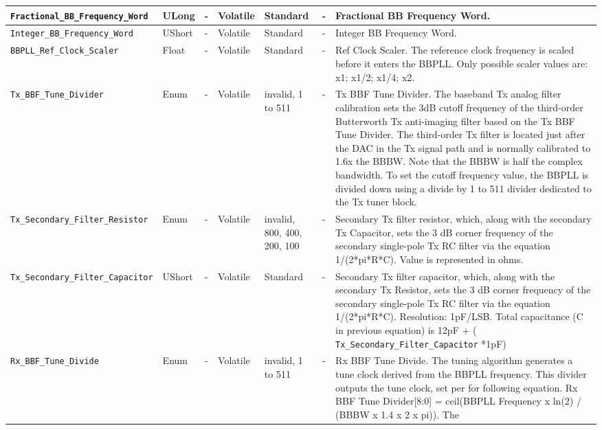 \documentclass{article}
\begin{document}
\begin{landscape}
\begin{scriptsize}
\begin{longtable}{|p{3.6cm}|p{8.1cm}|p{1.4cm}|p{1.3cm}|p{1.4cm}|p{2.5cm}|p{3.6cm}|}
			\hline
			\verb+Fractional_BB_Frequency_Word+ & ULong & - & Volatile & Standard & - & Fractional BB Frequency Word. \\
			\hline
			\verb+Integer_BB_Frequency_Word+ & UShort & - & Volatile & Standard & - & Integer BB Frequency Word. \\
			\hline
			\verb+BBPLL_Ref_Clock_Scaler+ & Float & - & Volatile & Standard & - & Ref Clock Scaler. The reference clock frequency is scaled before it enters the BBPLL. Only possible scaler values are: x1; x1/2; x1/4; x2. \\
			\hline
			\verb+Tx_BBF_Tune_Divider+ & Enum & - & Volatile & invalid, 1 to 511 & - & Tx BBF Tune Divider. The baseband Tx analog filter calibration sets the 3dB cutoff frequency of the third-order Butterworth Tx anti-imaging filter based on the Tx BBF Tune Divider. The third-order Tx filter is located just after the DAC in the Tx signal path and is normally calibrated to 1.6x the BBBW. Note that the BBBW is half the complex bandwidth. To set the cutoff frequency value, the BBPLL is divided down using a divide by 1 to 511 divider dedicated to the Tx tuner block. \\
			\hline
			\verb+Tx_Secondary_Filter_Resistor+ & Enum & - & Volatile & invalid, 800, 400, 200, 100 & - & Secondary Tx filter resistor, which, along with the secondary Tx Capacitor, sets the 3 dB corner frequency of the secondary single-pole Tx RC filter via the equation 1/(2*pi*R*C). Value is represented in ohms. \\
			\hline
			\verb+Tx_Secondary_Filter_Capacitor+ & UShort & - & Volatile & Standard & - &
Secondary Tx filter capacitor, which, along with the secondary Tx Resistor, sets the 3 dB corner frequency of the secondary single-pole Tx RC filter via the equation 1/(2*pi*R*C). Resolution: 1pF/LSB. Total capacitance (C in previous equation) is 12pF + ( \verb+Tx_Secondary_Filter_Capacitor+ *1pF) \\
			\hline
			\verb+Rx_BBF_Tune_Divide+ & Enum & - & Volatile & invalid, 1 to 511 & - &
                                      Rx BBF Tune Divide. The
                                        tuning algorithm generates a tune clock
                                        derived from the BBPLL frequency. This
                                        divider outputs the tune clock, set per
                                        for following equation. Rx BBF Tune
                                        Divider[8:0] = ceil(BBPLL Frequency x
                                        ln(2) / (BBBW x 1.4 x 2 x pi)). The

\end{longtable}
\end{scriptsize}
\end{landscape}
\end{document}

